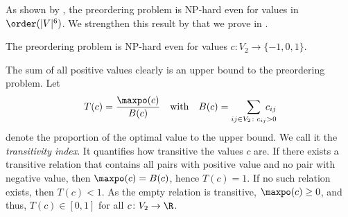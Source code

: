 As shown by \citet{wakabayashi1998complexity}, the preordering problem is \textsc{NP}-hard even for values in $\order(\lvert V \rvert^6)$.
We strengthen this result by  that we prove in .
\begin{theorem}\label{thm:np-hard}
    The preordering problem is \textsc{NP}-hard even for values $c\colon V_2 \to \{-1, 0, 1\}$.
\end{theorem}

The sum of all positive values clearly is an upper bound to the preordering problem. 
Let
\begin{align}\label{eq:transitivity-measure}
    T(c) = \frac{\maxpo(c)}{B(c)} 
    \quad \text{with} \quad
    B(c) = \sum_{ij \in V_2\colon c_{ij} > 0} \hspace{-3ex} c_{ij}
\end{align}
denote the proportion of the optimal value to the upper bound.
We call it the \emph{transitivity index}.
It quantifies how transitive the values $c$ are.
If there exists a transitive relation that contains all pairs with positive value and no pair with negative value, then $\maxpo(c) = B(c)$, hence $T(c) = 1$.
If no such relation exists, then $T(c) < 1$.
As the empty relation is transitive, $\maxpo(c) \geq 0$, and thus, $T(c) \in [0, 1]$ for all $c\colon V_2 \to \R$.
